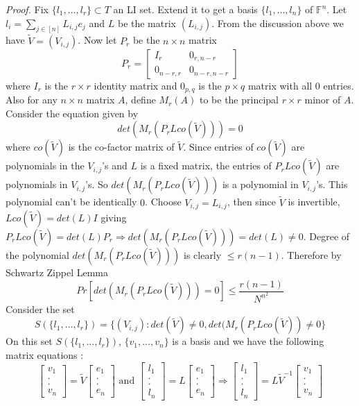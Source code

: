 \documentclass[letterpaper,USenglish,numberwithinsect]{lipics}
\newcommand{\F}{\mathbb{F}}
\begin{document}
\emph{Proof.}
Fix $\{l_1,\ldots,l_r\}\subset T$ an LI set. Extend it to get a basis $\{l_1,\ldots,l_n\}$ of $\F^n$.
Let $l_i = \sum\limits_{j\in [n]}L_{i,j}e_j$ and $L$ be the matrix $(L_{i,j})$. From the discussion
above we have $\tilde V=(V_{i,j})$. Now let $P_r$ be the $n\times n$ matrix
\[
P_r = \begin{bmatrix}
    I_r       & 0_{r,n-r} \\
    0_{n-r,r}      & 0_{n-r,n-r}
\end{bmatrix}
\]
where $I_r$ is the $r\times r$ identity matrix and $0_{p,q}$ is the $p\times q$ matrix with all $0$ entries. Also for
any $n\times n$ matrix $A$, define $M_r(A)$ to be the principal $r\times r$ minor of $A$. Consider the equation given by
\[
 det(M_r(P_r L co(\tilde V))) =0
\]
where $co(\tilde V)$ is the co-factor matrix of $\tilde V$. Since entries of $co(\tilde V)$ are polynomials in the $V_{i,j}$'s and $L$ is a fixed matrix,
the entries of $P_rLco(\tilde V)$ are polynomials in $V_{i,j}$'s. So $det(M_r(P_r L co(\tilde V)))$ is a polynomial in $V_{i,j}$'s.
This polynomial can't be identically $0$. Choose $V_{i,j}=L_{i,j}$, then since $\tilde V$ is invertible, $Lco(\tilde V) = det(L) I$ giving
$P_rLco(\tilde V) = det(L) P_r \Rightarrow det(M_r(P_r L co(\tilde V))) = det(L)\neq 0$. Degree of the polynomial $det(M_r(P_rLco(\tilde V)))$ is clearly
$\leq r(n-1)$. Therefore by Schwartz Zippel Lemma
\[
 Pr[det(M_r(P_r L co(\tilde V))) =0] \leq \frac{r(n-1)}{N^{n^2}}
\]
Consider the set
\[
 S(\{l_1,\ldots,l_r\}) = \{(V_{i,j}) : det(\tilde V)\neq 0 , det(M_r(P_r L co(\tilde V))\neq 0\}
\]
On this set $S(\{l_1,\ldots,l_r\})$, $\{v_1,\ldots,v_n\}$ is a basis and we have the following matrix equations :
\[
 \begin{bmatrix}
    v_1 \\
    . \\
    . \\
    v_n
\end{bmatrix} =  \tilde V  \begin{bmatrix}
    e_1 \\
    . \\
    . \\
    e_n
\end{bmatrix} \text{ and }
\begin{bmatrix}
    l_1 \\
    . \\
    . \\
    l_n
\end{bmatrix} =  L  \begin{bmatrix}
    e_1 \\
    . \\
    . \\
    e_n
\end{bmatrix}
\Rightarrow
\begin{bmatrix}
    l_1 \\
    . \\
    . \\
    l_n
\end{bmatrix} =  L\tilde V^{-1}  \begin{bmatrix}
    v_1 \\
    . \\
    . \\
    v_n
\end{bmatrix}
\]
\end{document}
